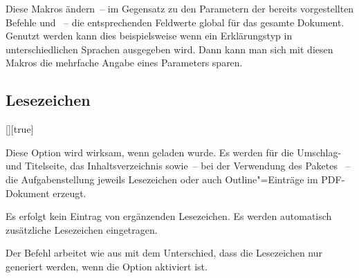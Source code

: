 \documentclass[%
  english,ngerman,%
  headings=optiontoheadandtoc,captions=tableheading,numbers=noenddot,%
  chapterpage,cdfoot,%
]{tudscrman}
\begin{document}
\begin{Declaration}{}
\begin{Declaration}{}
\begin{Declaration}{}
\begin{Declaration}{}
\printdeclarationlist%
%

Diese Makros ändern~-- im Gegensatz zu den Parametern der bereits vorgestellten 
Befehle  und ~-- die entsprechenden 
Feldwerte global für das gesamte Dokument. Genutzt werden kann dies 
beispielsweise wenn ein Erklärungstyp in unterschiedlichen Sprachen ausgegeben 
wird. Dann kann man sich mit diesen Makros die mehrfache Angabe eines Parameters 
sparen.
\end{Declaration}
\end{Declaration}
\end{Declaration}
\end{Declaration}

\subsection{Lesezeichen}
\begin{Declaration}{[\PBoolean]}[true]%
\begin{Declaration}{%
}%
\printdeclarationlist%
%
%
%
%
Diese Option wird wirksam, wenn  geladen wurde. Es werden für 
die Umschlag- und Titelseite, das Inhaltsverzeichnis sowie~-- bei der Verwendung 
des Paketes ~-- die Aufgabenstellung jeweils 
Lesezeichen oder auch Outline"=Einträge im PDF-Dokument erzeugt.
%
\begin{values}
\itemfalse
  Es erfolgt kein Eintrag von ergänzenden Lesezeichen.
\itemtrue*
  Es werden automatisch zusätzliche Lesezeichen eingetragen.
\end{values}
%
Der Befehl  arbeitet wie  aus 
 mit dem Unterschied, dass die Lesezeichen nur generiert 
werden, wenn die Option  aktiviert ist.
\end{Declaration}
\end{Declaration}
\end{document}
